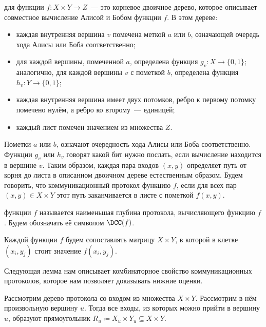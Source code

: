 \begin{definition}
     для функции $f\colon X \times Y \to Z$~--- это корневое двоичное
    дерево, которое описывает совместное вычисление Алисой и Бобом функции $f$. В этом дереве:
    \begin{itemize}
        \item каждая внутренняя вершина $v$ помечена меткой $a$ или $b$, означающей очередь хода Алисы
            или Боба соответственно;
        \item для каждой вершины, помеченной $a$, определена функция $g_v\colon X \to \{0, 1\}$;
            аналогично, для каждой вершины $v$ с пометкой $b$, определена функция $h_v\colon Y \to \{0,
            1\}$;
        \item каждая внутренняя вершина имеет двух потомков, ребро к первому потомку помечено нулём, а
            ребро ко второму~--- единицей;
        \item каждый лист помечен значением из множества $Z$.
    \end{itemize}

    Пометки $a$ или $b$, означают очередность хода Алисы или Боба соответственно. Функции $g_v$ или $h_v$
    говорят какой бит нужно послать, если вычисление находится в вершине $v$. Таким образом, каждая пара
    входов $(x, y)$ определяет путь от корня до листа в описанном двоичном дереве естественным
    образом. Будем говорить, что коммуникационный протокол  функцию $f$, если для всех
    пар $(x, y) \in X \times Y $ этот путь заканчивается в листе с пометкой $f(x, y)$.  
    
     функции $f$ называется наименьшая глубина протокола,
    вычисляющего функцию $f$. Будем обозначать её символом $\DCC(f)$.
    
    Каждой функции $f$ будем сопоставлять матрицу $X \times Y$, в которой в клетке $(x_i, y_j)$ стоит
    значение $f(x_i, y_j)$.
\end{definition}

Следующая лемма нам описывает комбинаторное свойство коммуникационных протоколов, которое нам позволяет
доказывать нижние оценки.

\begin{proposition} 
    Рассмотрим дерево протокола со входом из множества $X \times Y$. Рассмотрим в нём произвольную
    вершину $u$. Тогда все входы, из которых можно прийти в вершину $u$, образуют прямоугольник
    $R_u \coloneqq X_u \times Y_u \subseteq X \times Y$.
\end{proposition}


